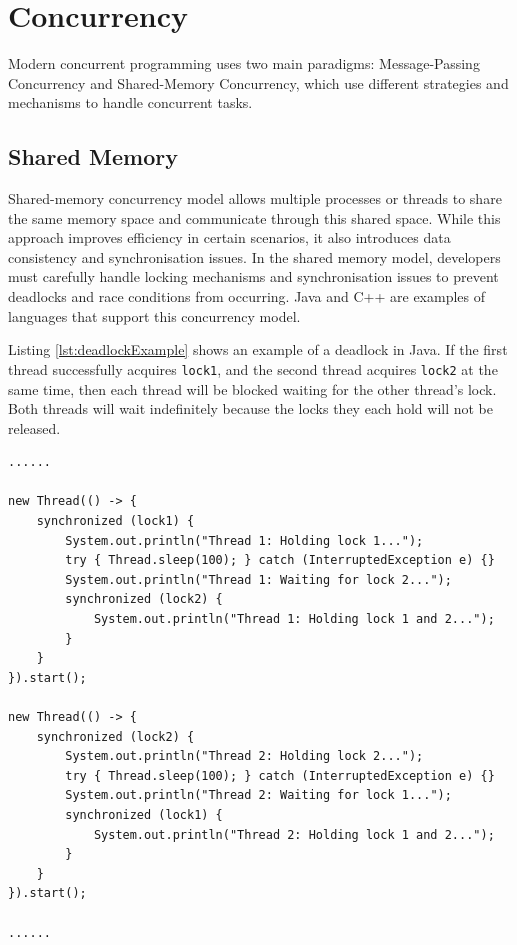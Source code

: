 \documentclass{l4proj}
\begin{document}
\section{Concurrency}
Modern concurrent programming uses two main paradigms: Message-Passing Concurrency and Shared-Memory Concurrency, which use different strategies and mechanisms to handle concurrent tasks.

\subsection{Shared Memory}
Shared-memory concurrency model allows multiple processes or threads to share the same memory space and communicate through this shared space. While this approach improves efficiency in certain scenarios, it also introduces data consistency and synchronisation issues. In the shared memory model, developers must carefully handle locking mechanisms and synchronisation issues to prevent deadlocks and race conditions from occurring. Java and C++ are examples of languages that support this concurrency model.

Listing \ref{lst:deadlockExample} shows an example of a deadlock in Java. If the first thread successfully acquires \texttt{lock1}, and the second thread acquires \texttt{lock2} at the same time, then each thread will be blocked waiting for the other thread's lock. Both threads will wait indefinitely because the locks they each hold will not be released.

\lstset{style=javastyle}
\begin{lstlisting}[caption={Java example demonstrating a potential deadlock}, label={lst:deadlockExample}]
......

new Thread(() -> {
    synchronized (lock1) {
        System.out.println("Thread 1: Holding lock 1...");
        try { Thread.sleep(100); } catch (InterruptedException e) {}
        System.out.println("Thread 1: Waiting for lock 2...");
        synchronized (lock2) {
            System.out.println("Thread 1: Holding lock 1 and 2...");
        }
    }
}).start();
        
new Thread(() -> {
    synchronized (lock2) {
        System.out.println("Thread 2: Holding lock 2...");
        try { Thread.sleep(100); } catch (InterruptedException e) {}
        System.out.println("Thread 2: Waiting for lock 1...");
        synchronized (lock1) {
            System.out.println("Thread 2: Holding lock 1 and 2...");
        }
    }
}).start();

......
\end{lstlisting}
\end{document}
